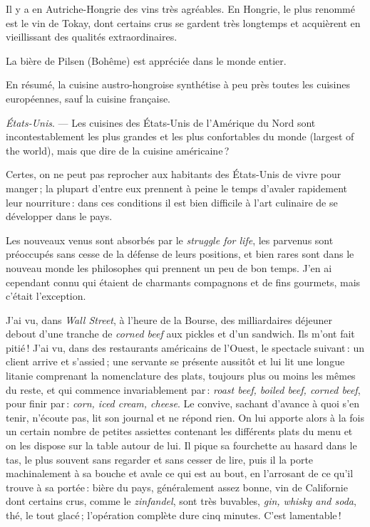 Il y a en Autriche-Hongrie des vins très agréables. En Hongrie, le plus renommé
est le vin de Tokay, dont certains crus se gardent très longtemps et acquièrent
en vieillissant des qualités extraordinaires.

La bière de Pilsen (Bohême) est appréciée dans le monde entier.

En résumé, la cuisine austro-hongroise synthétise à peu près toutes les cuisines
européennes, sauf la cuisine française.

\sk

\textit{États-Unis}. — Les cuisines des États-Unis de l'Amérique du Nord sont
incontestablement les plus grandes et les plus confortables du monde (largest
of the world), mais que dire de la cuisine américaine ?

Certes, on ne peut pas reprocher aux habitants des États-Unis de vivre pour
manger ; la plupart d’entre eux prennent à peine le temps d'avaler rapidement
leur nourriture : dans ces conditions il est bien difficile à l'art culinaire
de se développer dans le pays.

Les nouveaux venus sont absorbés par le \textit{struggle for life}, les
parvenus sont préoccupés sans cesse de la défense de leurs positions, et bien
rares sont dans le nouveau monde les philosophes qui prennent un peu de bon
temps. J'en ai cependant connu qui étaient de charmants compagnons et de fins
gourmets, mais c'était l'exception.

J'ai vu, dans \textit{Wall Street}, à l'heure de la Bourse, des milliardaires
déjeuner debout d'une tranche de \textit{corned beef} aux pickles et d'un
sandwich. Ils m'ont fait pitié ! J'ai vu, dans des restaurants américains de
l'Ouest, le spectacle suivant : un client arrive et s'assied ; une servante se
présente aussitôt et lui lit une longue litanie comprenant la nomenclature des
plats, toujours plus ou moins les mêmes du reste, et qui commence
invariablement par : \textit{roast beef, boiled beef, corned beef}, pour finir
par : \textit{corn, iced cream, cheese}. Le convive, sachant d'avance à quoi
s'en tenir, n'écoute pas, lit son journal et ne répond rien. On lui apporte
alors à la fois un certain nombre de petites assiettes contenant les différents
plats du menu et on les dispose sur la table autour de lui. Il pique sa
fourchette au hasard dans le tas, le plus souvent sans regarder et sans cesser
de lire, puis il la porte machinalement à sa bouche et avale ce qui est au
bout, en l'arrosant de ce qu'il trouve à sa portée : bière du pays,
généralement assez bonne, vin de Californie dont certains crus, comme le
\textit{zinfandel}, sont très buvables, \textit{gin, whisky and soda}, thé, le
tout glacé ; l'opération complète dure cinq minutes. C'est lamentable !

